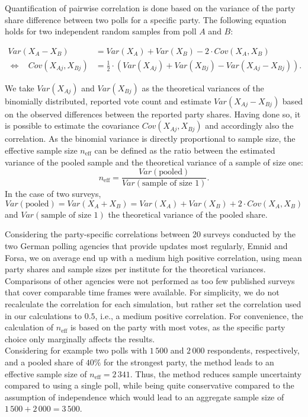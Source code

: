 \documentclass[smallcondensed]{svjour3}     %
\begin{document}
Quantification of pairwise correlation is done based on the variance of the party
share difference between two polls for a specific party. The following equation
holds for two independent random samples from poll $A$ and $B$:

\begin{equation}
\begin{aligned}
Var(X_A - X_B) &= Var(X_A) + Var(X_B) - 2 \cdot Cov(X_A, X_B) \\
\Leftrightarrow \ \ \ \ Cov(X_{Aj}, X_{Bj}) &= \frac{1}{2} \cdot \left(Var(X_{Aj}) + Var(X_{Bj}) - Var(X_{Aj} - X_{Bj}) \right).
\end{aligned}
\end{equation}

We take $Var(X_{Aj})$ and $Var(X_{Bj})$ as the theoretical variances of the
binomially distributed, reported vote count and estimate $Var(X_{Aj} - X_{Bj})$
based on the observed differences between the reported party shares. Having done so,
it is possible to estimate the covariance $Cov(X_{Aj}, X_{Bj})$ and accordingly
also the correlation. As the binomial variance is directly proportional to sample
size, the effective sample size $n_{\text{eff}}$ can be defined as the ratio
between the estimated variance of the pooled sample and the theoretical variance
of a sample of size one:
$$
n_{\text{eff}} = \frac{Var(\text{pooled})}{Var(\text{sample of size 1})}.
$$
In the case of two surveys,
$$
Var(\text{pooled}) = Var(X_A + X_B) = Var(X_A) + Var(X_B) + 2 \cdot Cov(X_A,X_B)
$$
and $Var(\text{sample of size 1})$ the theoretical variance of the pooled share.

Considering the party-specific correlations between 20 surveys conducted by the
two German polling agencies that provide updates most regularly, Emnid and Forsa,
we on average end up with a medium high positive correlation, using mean party
shares and sample sizes per institute for the theoretical variances. Comparisons
of other agencies were not performed as too few published surveys that
cover comparable time frames were available. For simplicity, we do not recalculate
the correlation for each simulation, but rather set the correlation used in our
calculations to $0.5$, i.e., a medium positive correlation. For convenience, the
calculation of $n_{\text{eff}}$ is based on the party with most votes, as the
specific party choice only marginally affects the results.\\

Considering for example two polls with $1\,500$ and $2\,000$ respondents,
respectively, and a pooled share of $40\%$ for the strongest party, the method
leads to an effective sample size of $n_{\text{eff}} = 2\,341$. Thus, the method
reduces sample uncertainty compared to using a single poll, while being quite
conservative compared to the assumption of independence which would lead to
an aggregate sample size of $1\,500 + 2\,000 = 3\,500$.\\
\end{document}
